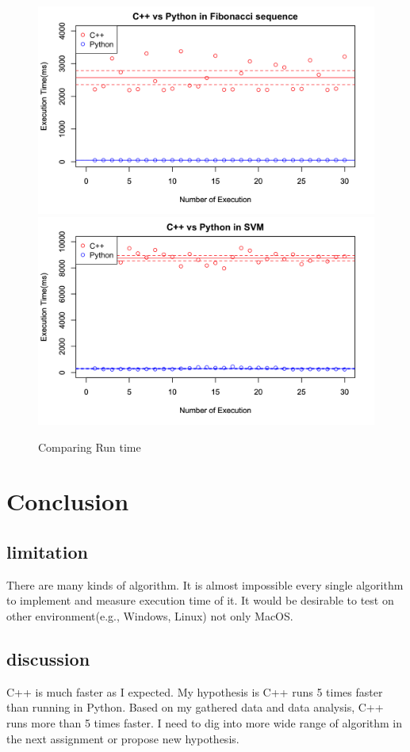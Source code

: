\documentclass[11pt, a4paper]{article}
\begin{document}
\begin{figure}[htbp]
\begin{center}
\includegraphics[clip, width=180mm]{00002d.png}
\includegraphics[clip, width=180mm]{000017.png}
\end{center}
\caption{Comparing Run time}
\end{figure}

\section{Conclusion}
\subsection{limitation}
There are many kinds of algorithm. It is almost impossible every single algorithm to implement and measure execution time of it. It would be desirable to test on other environment(e.g., Windows, Linux) not only MacOS. 
\subsection{discussion}
C++ is much faster as I expected. My hypothesis is C++ runs 5 times faster than running in Python. Based on my gathered data and data analysis, C++ runs more than 5 times faster. I need to dig into more wide range of algorithm in the next assignment or propose new hypothesis.
\end{document}
